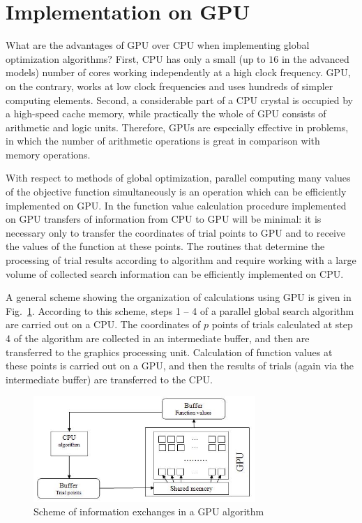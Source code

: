 \documentclass[smallcondensed]{svjour3}     %
\begin{document}
\section{Implementation on GPU} \label{sec:5}

What are the advantages of GPU over CPU when implementing global optimization algorithms? First, CPU has only a small (up to $16$ in the advanced models) number of cores working independently at a high clock frequency. GPU, on the contrary, works at low clock frequencies and uses hundreds of simpler computing elements. Second, a considerable part of a CPU crystal is occupied by a high-speed cache memory, while practically the whole of GPU consists of arithmetic and logic units. Therefore, GPUs are especially effective in problems, in which the number of arithmetic operations is great in comparison with memory operations.

With respect to methods of global optimization, parallel computing many values of the objective function simultaneously is an operation which can be efficiently implemented on GPU. In the function value calculation procedure implemented on GPU transfers of information from CPU to GPU will be minimal: it is necessary only to transfer the coordinates of trial points to GPU and to receive the values of the function at these points. The routines that determine the processing of trial results according to algorithm and require working with a large volume of collected search information can be efficiently implemented on CPU.

A general scheme showing the organization of calculations using GPU is given in Fig.~\ref{fig:3}. According to this scheme, steps 1 -- 4 of a parallel global search algorithm are carried out on a CPU. The coordinates of $p$ points of trials calculated at step 4 of the algorithm are collected in an intermediate buffer, and then are transferred to the graphics processing unit. Calculation of function values at these points is carried out on a GPU, and then the results of trials (again via the intermediate buffer) are transferred to the CPU.

\begin{figure}
	\center
  \includegraphics[width=0.75\textwidth]{fig4.jpg} 
  \caption{Scheme of information exchanges in a GPU algorithm}
  \label{fig:3}
\end{figure}
\end{document}
